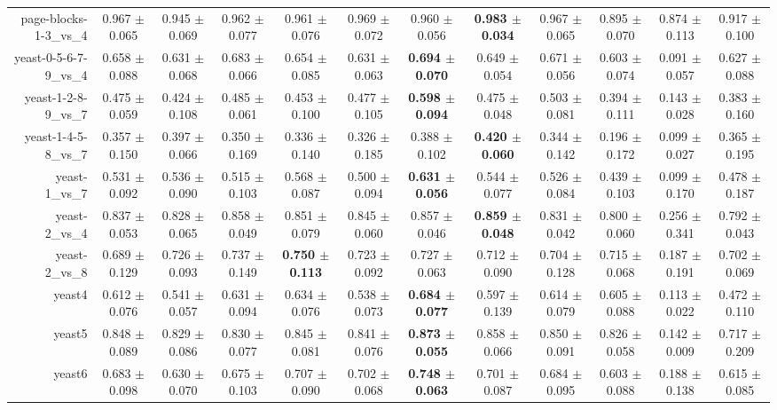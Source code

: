 \begin{table}[!ht]
{\begin{tabular}{r c c c c c c c c c c c}
page-blocks-1-3\_vs\_4 & 0.967 $\pm$ 0.065 & 0.945 $\pm$ 0.069 & 0.962 $\pm$ 0.077 & 0.961 $\pm$ 0.076 & 0.969 $\pm$ 0.072 & 0.960 $\pm$ 0.056 & \textbf{0.983 $\pm$ 0.034} & 0.967 $\pm$ 0.065 & 0.895 $\pm$ 0.070 & 0.874 $\pm$ 0.113 & 0.917 $\pm$ 0.100 \\
yeast-0-5-6-7-9\_vs\_4 & 0.658 $\pm$ 0.088 & 0.631 $\pm$ 0.068 & 0.683 $\pm$ 0.066 & 0.654 $\pm$ 0.085 & 0.631 $\pm$ 0.063 & \textbf{0.694 $\pm$ 0.070} & 0.649 $\pm$ 0.054 & 0.671 $\pm$ 0.056 & 0.603 $\pm$ 0.074 & 0.091 $\pm$ 0.057 & 0.627 $\pm$ 0.088 \\
yeast-1-2-8-9\_vs\_7 & 0.475 $\pm$ 0.059 & 0.424 $\pm$ 0.108 & 0.485 $\pm$ 0.061 & 0.453 $\pm$ 0.100 & 0.477 $\pm$ 0.105 & \textbf{0.598 $\pm$ 0.094} & 0.475 $\pm$ 0.048 & 0.503 $\pm$ 0.081 & 0.394 $\pm$ 0.111 & 0.143 $\pm$ 0.028 & 0.383 $\pm$ 0.160 \\
yeast-1-4-5-8\_vs\_7 & 0.357 $\pm$ 0.150 & 0.397 $\pm$ 0.066 & 0.350 $\pm$ 0.169 & 0.336 $\pm$ 0.140 & 0.326 $\pm$ 0.185 & 0.388 $\pm$ 0.102 & \textbf{0.420 $\pm$ 0.060} & 0.344 $\pm$ 0.142 & 0.196 $\pm$ 0.172 & 0.099 $\pm$ 0.027 & 0.365 $\pm$ 0.195 \\
yeast-1\_vs\_7 & 0.531 $\pm$ 0.092 & 0.536 $\pm$ 0.090 & 0.515 $\pm$ 0.103 & 0.568 $\pm$ 0.087 & 0.500 $\pm$ 0.094 & \textbf{0.631 $\pm$ 0.056} & 0.544 $\pm$ 0.077 & 0.526 $\pm$ 0.084 & 0.439 $\pm$ 0.103 & 0.099 $\pm$ 0.170 & 0.478 $\pm$ 0.187 \\
yeast-2\_vs\_4 & 0.837 $\pm$ 0.053 & 0.828 $\pm$ 0.065 & 0.858 $\pm$ 0.049 & 0.851 $\pm$ 0.079 & 0.845 $\pm$ 0.060 & 0.857 $\pm$ 0.046 & \textbf{0.859 $\pm$ 0.048} & 0.831 $\pm$ 0.042 & 0.800 $\pm$ 0.060 & 0.256 $\pm$ 0.341 & 0.792 $\pm$ 0.043 \\
yeast-2\_vs\_8 & 0.689 $\pm$ 0.129 & 0.726 $\pm$ 0.093 & 0.737 $\pm$ 0.149 & \textbf{0.750 $\pm$ 0.113} & 0.723 $\pm$ 0.092 & 0.727 $\pm$ 0.063 & 0.712 $\pm$ 0.090 & 0.704 $\pm$ 0.128 & 0.715 $\pm$ 0.068 & 0.187 $\pm$ 0.191 & 0.702 $\pm$ 0.069 \\
yeast4 & 0.612 $\pm$ 0.076 & 0.541 $\pm$ 0.057 & 0.631 $\pm$ 0.094 & 0.634 $\pm$ 0.076 & 0.538 $\pm$ 0.073 & \textbf{0.684 $\pm$ 0.077} & 0.597 $\pm$ 0.139 & 0.614 $\pm$ 0.079 & 0.605 $\pm$ 0.088 & 0.113 $\pm$ 0.022 & 0.472 $\pm$ 0.110 \\
yeast5 & 0.848 $\pm$ 0.089 & 0.829 $\pm$ 0.086 & 0.830 $\pm$ 0.077 & 0.845 $\pm$ 0.081 & 0.841 $\pm$ 0.076 & \textbf{0.873 $\pm$ 0.055} & 0.858 $\pm$ 0.066 & 0.850 $\pm$ 0.091 & 0.826 $\pm$ 0.058 & 0.142 $\pm$ 0.009 & 0.717 $\pm$ 0.209 \\
yeast6 & 0.683 $\pm$ 0.098 & 0.630 $\pm$ 0.070 & 0.675 $\pm$ 0.103 & 0.707 $\pm$ 0.090 & 0.702 $\pm$ 0.068 & \textbf{0.748 $\pm$ 0.063} & 0.701 $\pm$ 0.087 & 0.684 $\pm$ 0.095 & 0.603 $\pm$ 0.088 & 0.188 $\pm$ 0.138 & 0.615 $\pm$ 0.085 \\

\end{tabular}}
\end{table}
